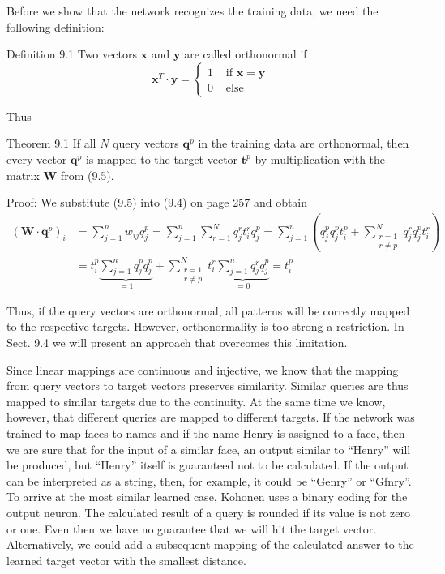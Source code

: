 \documentclass[10pt]{book}
\begin{document}
Before we show that the network recognizes the training data, we need the following definition:

Definition 9.1 Two vectors $\boldsymbol{x}$ and $\boldsymbol{y}$ are called orthonormal if
$$
\boldsymbol{x}^{T} \cdot \boldsymbol{y}= \begin{cases}1 & \text { if } \boldsymbol{x}=\boldsymbol{y} \\ 0 & \text { else }\end{cases}
$$

Thus

Theorem 9.1 If all $N$ query vectors $\boldsymbol{q}^{p}$ in the training data are orthonormal, then every vector $\boldsymbol{q}^{p}$ is mapped to the target vector $\boldsymbol{t}^{p}$ by multiplication with the matrix $\boldsymbol{W}$ from (9.5).

Proof: We substitute (9.5) into (9.4) on page 257 and obtain
$$
\begin{aligned}
\left(\boldsymbol{W} \cdot \boldsymbol{q}^{p}\right)_{i} & =\sum_{j=1}^{n} w_{i j} q_{j}^{p}=\sum_{j=1}^{n} \sum_{r=1}^{N} q_{j}^{r} t_{i}^{r} q_{j}^{p}=\sum_{j=1}^{n}\left(q_{j}^{p} q_{j}^{p} t_{i}^{p}+\sum_{\substack{r=1 \\
r \neq p}}^{N} q_{j}^{r} q_{j}^{p} t_{i}^{r}\right) \\
& =t_{i}^{p} \underbrace{\sum_{j=1}^{n} q_{j}^{p} q_{j}^{p}}_{=1}+\sum_{\substack{r=1 \\
r \neq p}}^{N} t_{i}^{r} \underbrace{\sum_{j=1}^{n} q_{j}^{r} q_{j}^{p}}_{=0}=t_{i}^{p}
\end{aligned}
$$

Thus, if the query vectors are orthonormal, all patterns will be correctly mapped to the respective targets. However, orthonormality is too strong a restriction. In Sect. 9.4 we will present an approach that overcomes this limitation.

Since linear mappings are continuous and injective, we know that the mapping from query vectors to target vectors preserves similarity. Similar queries are thus mapped to similar targets due to the continuity. At the same time we know, however, that different queries are mapped to different targets. If the network was trained to map faces to names and if the name Henry is assigned to a face, then we are sure that for the input of a similar face, an output similar to ``Henry'' will be produced, but ``Henry'' itself is guaranteed not to be calculated. If the output can be interpreted as a string, then, for example, it could be ``Genry'' or ``Gfnry''. To arrive at the most similar learned case, Kohonen uses a binary coding for the output neuron. The calculated result of a query is rounded if its value is not zero or one. Even then we have no guarantee that we will hit the target vector. Alternatively, we could add a subsequent mapping of the calculated answer to the learned target vector with the smallest distance.
\end{document}
